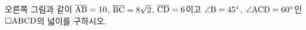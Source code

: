 \noindent\begin{minipage}[t]{0.58\linewidth}\vspace{0pt}\raggedright 오른쪽 그림과 같이 $\overline{\mathrm{AB}}=10$, $\overline{\mathrm{BC}}=8\sqrt{2}$, $\overline{\mathrm{CD}}=6$이고 $\angle\mathrm{B}=45^\circ$, $\angle\mathrm{ACD}=60^\circ$인 $\square\mathrm{ABCD}$의 넓이를 구하시오.\end{minipage}\hfill\begin{minipage}[t]{0.4\linewidth}\vspace{0pt}\centering \resizebox{\ifdim\width>\linewidth\linewidth\else\width\fi}{!}{}\end{minipage}\par
